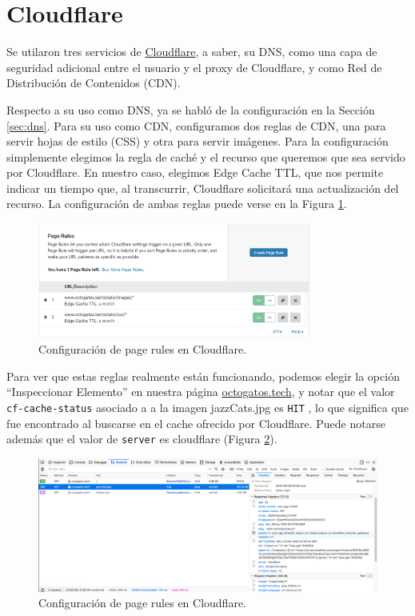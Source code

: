 \documentclass{article}
\newcommand{\ttt}[1]{%
\texttt{#1}%
}
\begin{document}
\section{Cloudflare}

Se utilaron tres servicios de
\href{https://www.cloudflare.com/}{Cloudflare}, a saber,
su DNS, como una capa de seguridad adicional entre el
usuario y el proxy de Cloudflare, y como Red de
Distribuci\'on de Contenidos (CDN).

Respecto a su uso como DNS, ya se habl\'o de la
configuraci\'on en la Secci\'on \ref{sec:dns}.   Para
su uso como CDN, configuramos dos reglas de CDN, una
para servir hojas de estilo (CSS) y otra para servir
im\'agenes.   Para la configuraci\'on simplemente
elegimos la regla de cach\'e y el recurso que queremos
que sea servido por Cloudflare.   En nuestro caso,
elegimos Edge Cache TTL, que nos permite indicar
un tiempo que, al transcurrir, Cloudflare solicitar\'a
una actualizaci\'on del recurso.   La configuraci\'on
de ambas reglas puede verse en la Figura
\ref{fig:pageRules}.

\begin{figure}[H]
  \centering
  \includegraphics[width=0.8\textwidth]{cloudflare/pageRules}
  \caption{Configuraci\'on de page rules en Cloudflare.}
  \label{fig:pageRules}
\end{figure}

Para ver que estas reglas realmente est\'an funcionando,
podemos elegir la opci\'on ``Inspeccionar Elemento'' en
nuestra p\'agina \href{https://octogatos.tech}{octogatos.tech},
y notar que el valor \ttt{cf-cache-status} asociado a
a la imagen jazzCats.jpg es \ttt{HIT}, lo que significa que
fue encontrado al buscarse en el cache ofrecido por Cloudflare.
Puede notarse adem\'as que el valor de \ttt{server} es
cloudflare (Figura \ref{fig:pageRulesHit}).


\begin{figure}[H]
  \centering
  \includegraphics[width=\textwidth]{cloudflare/pageRulesHit}
  \caption{Configuraci\'on de page rules en Cloudflare.}
  \label{fig:pageRulesHit}
\end{figure}
\end{document}
